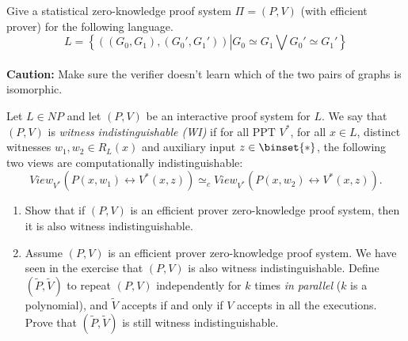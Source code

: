 \documentclass[12pt]{tufte-book}
\begin{document}
\begin{exercise} Give a statistical zero-knowledge proof system $\Pi = (P,V)$ (with efficient prover) for the following language.
    \[ L = \left\{((G_0,G_1),(G_0',G_1'))\left| G_0 \simeq G_1 \bigvee G_0' \simeq G_1'\right.\right\}\]\\
    \textbf{Caution:} Make sure the verifier doesn't learn which of the two pairs of graphs is isomorphic.
\end{exercise}

\begin{exercise} [ZK implies WI] Let $L \in NP$ and let $(P,V)$ be an interactive proof system for $L$. We say that $(P,V)$ is \emph{witness indistinguishable (WI)} if for all PPT $V^*$, for all $x \in L$, distinct witnesses $w_1, w_2 \in R_L(x)$ and  auxiliary input $z\in \binset{*}$, the following two views are computationally indistinguishable:
\[View_{V^*} \left(P(x,w_1) \leftrightarrow V^*(x,z) \right) \simeq_c View_{V^*} \left(P(x,w_2) \leftrightarrow V^*(x,z) \right).\]
\begin{enumerate}
\item Show that if $(P,V)$ is an efficient prover zero-knowledge proof system, then it is also witness indistinguishable.

\item Assume $(P,V)$ is an efficient prover zero-knowledge proof system. We have seen in the exercise that $(P,V)$ is also witness indistinguishable. Define $(\tilde P, \tilde V)$ to repeat $(P,V)$ independently for $k$ times \emph{in parallel} ($k$ is a polynomial), and $\tilde V$ accepts if and only if $V$ accepts in all the executions. Prove that $(\tilde P, \tilde V)$ is still witness indistinguishable.
\end{enumerate}    
\end{exercise}
\end{document}
